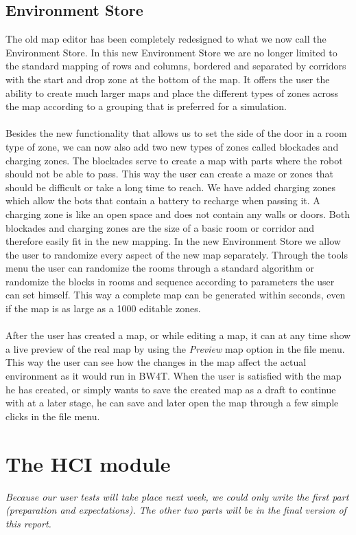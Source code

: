 \documentclass[]{article}
\begin{document}
\subsection{Environment Store}
The old map editor has been completely redesigned to what we now call the Environment Store. In this new Environment Store we are no longer limited to the standard mapping of rows and columns, bordered and separated by corridors with the start and drop zone at the bottom of the map. It offers the user the ability to create much larger maps and place the different types of zones across the map according to a grouping that is preferred for a simulation.\\
\\
Besides the new functionality that allows us to set the side of the door in a room type of zone, we can now also add two new types of zones called blockades and charging zones. The blockades serve to create a map with parts where the robot should not be able to pass. This way the user can create a maze or zones that should be difficult or take a long time to reach. We have added charging zones which allow the bots that contain a battery to recharge when passing it. A charging zone is like an open space and does not contain any walls or doors. Both blockades and charging zones are the size of a basic room or corridor and therefore easily fit in the new mapping.
In the new Environment Store we allow the user to randomize every aspect of the new map separately. Through the tools menu the user can randomize the rooms through a standard algorithm or randomize the blocks in rooms and sequence according to parameters the user can set himself. This way a complete map can be generated within seconds, even if the map is as large as a 1000 editable zones.\\
\\
After the user has created a map, or while editing a map, it can at any time show a live preview of the real map by using the \textit{Preview} map option in the file menu. This way the user can see how the changes in the map affect the actual environment as it would run in BW4T. When the user is satisfied with the map he has created, or simply wants to save the created map as a draft to continue with at a later stage, he can save and later open the map through a few simple clicks in the file menu.
\section{The HCI module}
\textit{Because our user tests will take place next week, we could
only write the first part (preparation and expectations). The other
two parts will be in the final version of this report.}
\end{document}
